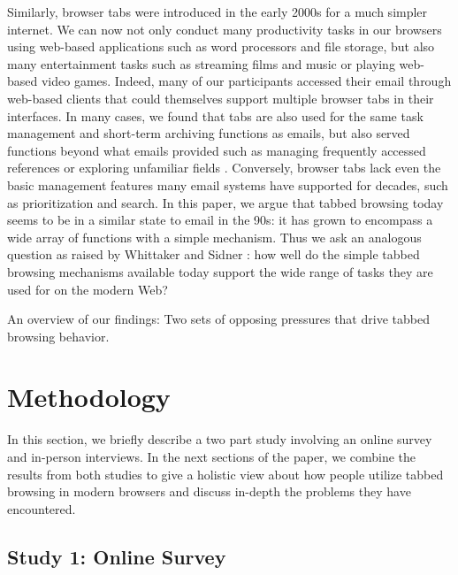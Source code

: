 Similarly, browser tabs were introduced in the early 2000s for a much simpler internet. We can now not only conduct many productivity tasks in our browsers using web-based applications such as word processors and file storage, but also many entertainment tasks such as streaming films and music or playing web-based video games. Indeed, many of our participants accessed their email through web-based clients that could themselves support multiple browser tabs in their interfaces. In many cases, we found that tabs are also used for the same task management and short-term archiving functions as emails, but also served functions beyond what emails provided such as managing frequently accessed references or exploring unfamiliar fields \cite{pirolli1999information,marchionini2006exploratory}. Conversely, browser tabs lack even the basic management features many email systems have supported for decades, such as prioritization and search.
In this paper, we argue that tabbed browsing today seems to be in a similar state to email in the 90s: it has grown to encompass a wide array of functions with a simple mechanism. Thus we ask an analogous question as raised by Whittaker and Sidner \cite{whittaker1996email}: how well do the simple tabbed browsing mechanisms available today support the wide range of tasks they are used for on the modern Web?

\begin{table*}
\centering
\footnotesize

  \caption[An overview of our findings in the tab usage study.]{An overview of our findings: Two sets of opposing pressures that drive tabbed browsing behavior.}
  \label{tab:overview}
\end{table*}


\section{Methodology}
In this section, we briefly describe a two part study involving an online survey and in-person interviews. In the next sections of the paper, we combine the results from both studies to give a holistic view about how people utilize tabbed browsing in modern browsers and discuss in-depth the problems they have encountered.

\subsection{Study 1: Online Survey}

